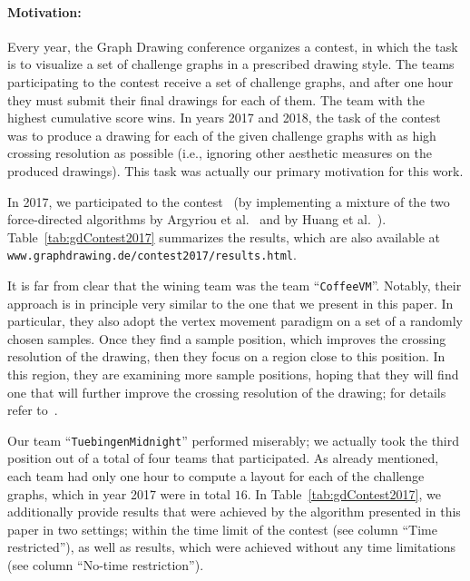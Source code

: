 \documentclass{comjnl}
\newcommand{\myparagraph}[1]{\medskip\noindent\textbf{#1}.}
\begin{document}
\paragraph{Motivation:}


Every year, the Graph Drawing conference organizes a contest, in which the task is to visualize a set of challenge graphs in a prescribed drawing style. The teams participating to the contest receive a set of challenge graphs, and after one hour they must submit their final drawings for each of them. The team with the highest cumulative score wins. 
%
In years 2017 and 2018, the task of the contest was to produce a drawing for each of the given challenge graphs with as high crossing resolution as possible (i.e., ignoring other aesthetic measures on the produced drawings). This task was actually our primary motivation for this work. 

In 2017, we participated to the contest~\cite{DBLP:conf/gd/DevannyKLR17} (by implementing a mixture of the two force-directed algorithms by Argyriou et al.~\cite{DBLP:journals/cj/ArgyriouBS13} and by Huang et al.~\cite{DBLP:journals/vlc/HuangEHL13}). 
%
Table~\ref{tab:gdContest2017} summarizes the results, which are also available at \texttt{www.graphdrawing.de/contest2017/results.html}. 

It is far from clear that the wining team was the team  ``\texttt{CoffeeVM}''. Notably,  their approach is in principle very similar to the one that we present in this paper. In particular, they also adopt the vertex movement paradigm on a set of a randomly chosen samples. Once they find a sample position, which improves the crossing resolution of the drawing, then they focus on a region close to this position. In this region, they are examining more sample positions, hoping that they will find one that will further improve the crossing resolution of the drawing; for details refer to~\cite{DBLP:conf/gd/DemelDMRW18}.

Our team ``\texttt{TuebingenMidnight}''  performed miserably; we actually took the third position out of a total of four teams that participated. As already mentioned, each team had only one hour to compute a layout for each of the challenge graphs, which in year 2017 were in total $16$. In Table~\ref{tab:gdContest2017}, we additionally provide results that were achieved by the algorithm presented in this paper in two settings; within the time limit of the contest (see column ``Time restricted''), as well as  results, which were achieved without any time limitations (see column ``No-time restriction'').
\end{document}
